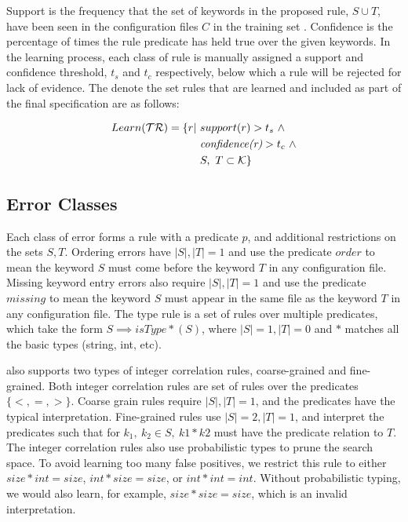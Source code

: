Support is the frequency that the set of keywords in the proposed rule, $S \cup T$, have been seen in the configuration files $C$ in the training set \trainingSet.
Confidence is the percentage of times the rule predicate has held true over the given keywords.
In the learning process, each class of rule is manually assigned a support and confidence threshold, $t_s$ and $t_c$ respectively, below which a rule will be rejected for lack of evidence.
The denote the set rules that are learned and included as part of the final specification are as follows:

\begin{align}
Learn(\mathcal{TR}) = \{r | \ &support(r) > t_s\ \land \nonumber \\
    & \textit{confidence(r)} > t_c\ \land \label{eq:learn}\\ 
    & S,\ T \subset \mathcal{K}\} \nonumber
\end{align}

\subsection{Error Classes}
Each class of error forms a rule with a predicate $p$, and additional restrictions on the sets $S, T$.
Ordering errors have $|S|, |T| = 1$ and use the predicate $order$ to mean the keyword $S$ must come before the keyword $T$ in any configuration file.
Missing keyword entry errors also require $|S|, |T| = 1$ and use the predicate $missing$ to mean the keyword $S$ must appear in the same file as the keyword $T$ in any configuration file.
The type rule is a set of rules over multiple predicates, which take the
form $S \implies \textit{isType}\ast(S)$, where $|S|=1, |T|=0$ and $\ast$ matches all the basic types (string, int, etc).

\app also supports two types of integer correlation rules, coarse-grained and fine-grained.
Both integer correlation rules are set of rules over the predicates $\{<,=,>\}$.
Coarse grain rules require $|S|, |T| = 1$, and the predicates have the typical interpretation.
Fine-grained rules use $|S|=2,|T|=1$, and interpret the predicates such that for $k_1,\ k_2 \in S,\ k1*k2$ must have the predicate relation to $T$.
The integer correlation rules also use probabilistic types to prune the search space.
To avoid learning too many false positives, we restrict this rule to either $size*int=size$, $int*size=size$, or $int*int = int$.
Without probabilistic typing, we would also learn, for example, $size*size=size$, which is an invalid interpretation.


